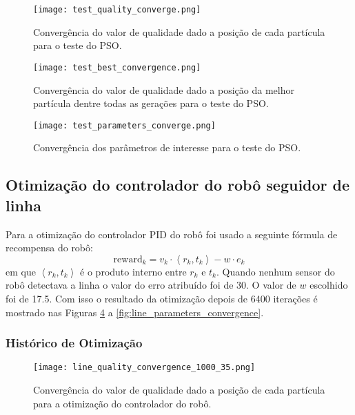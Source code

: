 \documentclass[brazil, 12pt]{article}
\begin{document}
\begin{figure}[H]
	\centering
	\texttt{[image: test\_quality\_converge.png]} %
	\caption{Convergência do valor de qualidade dado a posição de cada partícula para o teste do PSO.} %
	\label{fig:test_quality_converge}  %
\end{figure}

\begin{figure}[H]
	\centering
	\texttt{[image: test\_best\_convergence.png]} %
	\caption{Convergência do valor de qualidade dado a posição da melhor partícula dentre todas as gerações para o teste do PSO.} %
	\label{fig:test_best_convergence}  %
\end{figure}

\begin{figure}[H]
	\centering
	\texttt{[image: test\_parameters\_converge.png]} %
	\caption{Convergência dos parâmetros de interesse para o teste do PSO.} %
	\label{fig:test_parameters_converge}  %
\end{figure}

\subsection{Otimização do controlador do robô seguidor de linha}
Para a otimização do controlador PID do robô foi usado a seguinte fórmula de recompensa do robô:
\begin{equation}
	\text{reward}_{k}=v_{k}\cdot \left<r_{k},t_{k}\right>-w\cdot e_{k}\label{eq:reward}
\end{equation}em que $\left<r_{k},t_{k}\right>$ é o produto interno entre $r_{k}$ e $t_{k}$. Quando nenhum sensor do robô detectava a linha o valor do erro atribuído foi de 30. O valor de $w$ escolhido foi de 17.5. Com isso o resultado da otimização depois de 6400 iterações é mostrado nas Figuras \ref{fig:line_quality_convergence} a \ref{fig:line_parameters_convergence}.

\subsubsection{Histórico de Otimização}
\begin{figure}[H]
	\centering
	\texttt{[image: line\_quality\_convergence\_1000\_35.png]} %
	\caption{Convergência do valor de qualidade dado a posição de cada partícula para a otimização do controlador do robô.} %
	\label{fig:line_quality_convergence}  %
\end{figure}
\end{document}
